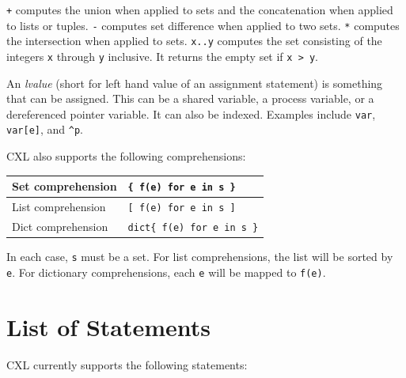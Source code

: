 \documentclass{report}
\begin{document}
\texttt{+} computes the union when applied to sets and
the concatenation when applied to lists or tuples.
\texttt{-} computes set difference when applied to two sets.
\texttt{*} computes the intersection when applied to sets.
\texttt{x..y} computes the set consisting of the integers \texttt{x}
through \texttt{y} inclusive.  It returns the empty set if \texttt{x > y}.

An \emph{lvalue} (short for left hand value of an assignment statement)
is something that can be assigned.  This can be a
shared variable, a process variable, or a dereferenced pointer
variable.  It can also be indexed.  Examples include
\texttt{var}, \texttt{var[e]}, and \texttt{\^{}p}.

CXL also supports the following comprehensions:

\vspace{1em}
\begin{tabular}{|l|l|}
\hline
Set comprehension & \texttt{\{ f(e) for e in s \}} \\
\hline
List comprehension & \texttt{[ f(e) for e in s ]} \\
\hline
Dict comprehension & \texttt{dict\{ f(e) for e in s \}} \\
\hline
\end{tabular}
\vspace{1em}

In each case, \texttt{s} must be a set.
For list comprehensions, the list will be sorted by \texttt{e}.
For dictionary comprehensions, each \texttt{e} will be mapped to \texttt{f(e)}.

\chapter{List of Statements}

CXL currently supports the following statements:
\end{document}
